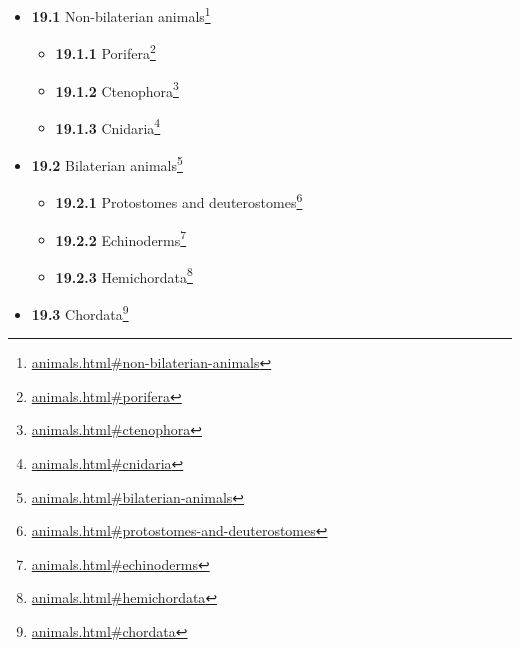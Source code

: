 \documentclass[
]{article}
\providecommand{\tightlist}{%
  \setlength{\itemsep}{0pt}\setlength{\parskip}{0pt}}
\providecommand{\tightlist}{%
  \setlength{\itemsep}{0pt}\setlength{\parskip}{0pt}}
\let\rmarkdownfootnote\footnote%
\def\footnote{\protect\rmarkdownfootnote}
\renewcommand{\href}[2]{#2\footnote{\url{#1}}}
\theoremstyle{definition}
\theoremstyle{definition}
\theoremstyle{definition}
\theoremstyle{remark}
\begin{document}
\begin{itemize}
  \begin{itemize}
  \tightlist
  \item
    \href{animals.html\#non-bilaterian-animals}{\emph{}\textbf{19.1}
    Non-bilaterian animals}

    \begin{itemize}
    \tightlist
    \item
      \href{animals.html\#porifera}{\emph{}\textbf{19.1.1} Porifera}
    \item
      \href{animals.html\#ctenophora}{\emph{}\textbf{19.1.2} Ctenophora}
    \item
      \href{animals.html\#cnidaria}{\emph{}\textbf{19.1.3} Cnidaria}
    \end{itemize}
  \item
    \href{animals.html\#bilaterian-animals}{\emph{}\textbf{19.2}
    Bilaterian animals}

    \begin{itemize}
    \tightlist
    \item
      \href{animals.html\#protostomes-and-deuterostomes}{\emph{}\textbf{19.2.1}
      Protostomes and deuterostomes}
    \item
      \href{animals.html\#echinoderms}{\emph{}\textbf{19.2.2}
      Echinoderms}
    \item
      \href{animals.html\#hemichordata}{\emph{}\textbf{19.2.3}
      Hemichordata}
    \end{itemize}
  \item
    \href{animals.html\#chordata}{\emph{}\textbf{19.3} Chordata}


\end{itemize}
\end{itemize}
\end{document}
